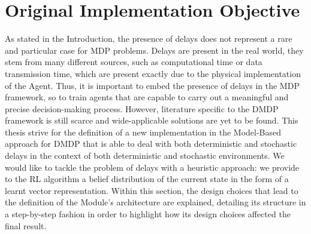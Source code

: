     \section{Original Implementation Objective}
    \label{ow:purposethesis}
        As stated in the Introduction, the presence of delays does not represent a rare and particular case for MDP problems. Delays are present in the real world, they stem from many different sources, such as computational time or data transmission time, which are present exactly due to the physical implementation of the Agent. Thus, it is important to embed the presence of delays in the MDP framework, so to train agents that are capable to carry out a meaningful and precise decision-making process. However, literature specific to the DMDP framework is still scarce and wide-applicable solutions are yet to be found. \newline
        This thesis strive for the definition of a new implementation in the Model-Based approach for DMDP that is able to deal with both deterministic and stochastic delays in the context of both deterministic and stochastic environments. We would like to tackle the problem of delays with a heuristic approach: we provide to the RL algorithm a belief distribution of the current state in the form of a learnt vector representation.\newline
        Within this section, the design choices that lead to the definition of the Module's architecture are explained, detailing its structure in a step-by-step fashion in order to highlight how its design choices affected the final result. 
        
